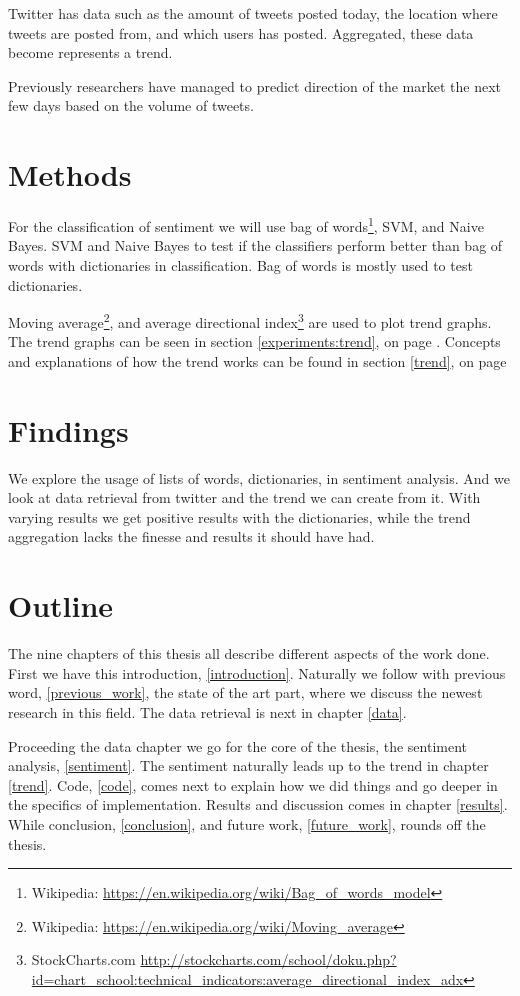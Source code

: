 Twitter has data such as the amount of tweets posted today, the location where
tweets are posted from, and which users has posted. Aggregated, these data
become represents a trend.  

Previously researchers have managed to predict direction of the market the
next few days based on the volume of tweets. 

\section{Methods}

For the classification of sentiment we will use bag of words\footnote{Wikipedia:
\url{https://en.wikipedia.org/wiki/Bag_of_words_model}}, SVM, and Naive Bayes.
SVM and Naive Bayes to test if the classifiers perform better than bag of words
with dictionaries in classification. Bag of words is mostly used to test
dictionaries.

Moving average\footnote{Wikipedia:
\url{https://en.wikipedia.org/wiki/Moving_average}}, and average directional
index\footnote{StockCharts.com
\url{http://stockcharts.com/school/doku.php?id=chart_school:technical_indicators:average_directional_index_adx}}
are used to plot trend graphs. The trend graphs can be seen in section
\ref{experiments:trend}, on
page \pageref{experiments:trend}. Concepts and explanations of how the trend
works can be found in section \ref{trend}, on page \pageref{trend}

\section{Findings}
We explore the usage of lists of words, dictionaries, in sentiment analysis.
And we look at data retrieval from twitter and the trend we can create from it. 
With varying results we get positive results with the dictionaries, while the
trend aggregation lacks the finesse and results it should have had. 

\section{Outline}
The nine chapters of this thesis all describe different aspects of the work
done. First we have this introduction, \ref{introduction}. Naturally we follow
with previous word, \ref{previous_work}, the state of the art part, where we
discuss the newest research in this field. The data retrieval is next in
chapter \ref{data}. 

Proceeding the data chapter we go for the core of the thesis, the sentiment
analysis, \ref{sentiment}. The sentiment naturally leads up to the trend in
chapter \ref{trend}. Code, \ref{code}, comes next to explain how we did things
and go deeper in the specifics of implementation. Results and discussion comes
in chapter \ref{results}. While conclusion, \ref{conclusion}, and future work,
\ref{future_work}, rounds off the thesis.
%
